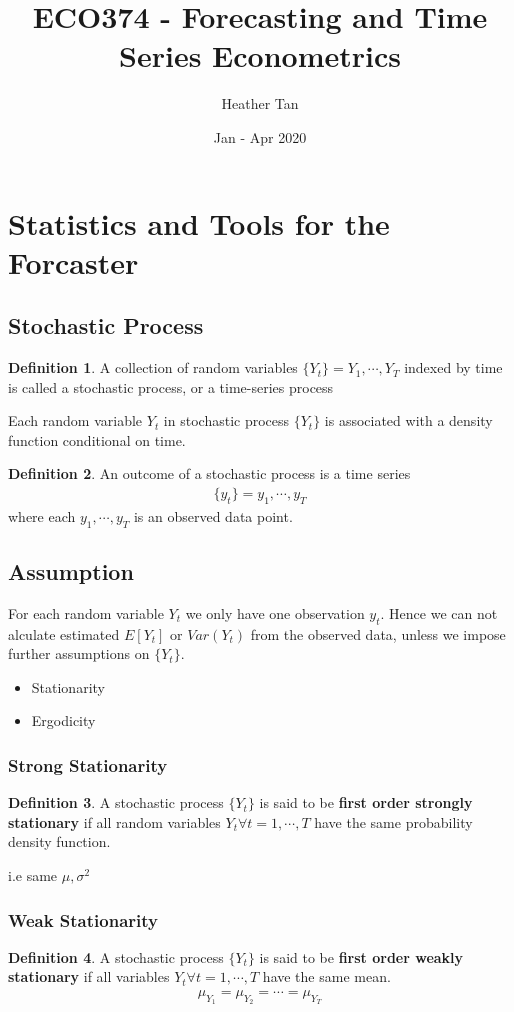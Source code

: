 \documentclass{article}
\title{ECO374 - Forecasting and Time Series Econometrics}
\author{Heather Tan}
\date{Jan - Apr 2020}
\theoremstyle{definition}
\newtheorem{definition}{Definition}[section]
\theoremstyle{thrm}
\theoremstyle{lma}
\theoremstyle{ppst}
\theoremstyle{crlr}
\begin{document}
\maketitle	
\tableofcontents
\pagebreak


\section{Statistics and Tools for the Forcaster}
\subsection{Stochastic Process}
\begin{definition}
	A collection of random variables $\{Y_t\} = Y_1,\cdots,Y_T$ indexed by time is called a stochastic process, or a time-series process
\end{definition}
Each random variable $Y_t$ in stochastic process $\{Y_t\}$ is associated with a density function conditional on time.\\
\begin{definition}
	An outcome of a stochastic process is a time series
\begin{align*}
	\{y_t\} = y_1,\cdots, y_T
\end{align*}
where each $y_1,\cdots, y_T$ is an observed data point.
\end{definition}
\subsection{Assumption}
For each random variable $Y_t$ we only have one observation $y_t$. Hence we can not alculate estimated $E[Y_t]$ or $Var(Y_t)$ from the observed data, unless we impose further assumptions on $\{Y_t\}$.
\begin{itemize}
	\item Stationarity
	\item Ergodicity
\end{itemize}
\subsubsection{Strong Stationarity}
\begin{definition}
	A stochastic process $\{Y_t\}$ is said to be \textbf{first order strongly stationary} if all random variables $Y_t \forall t = 1,\cdots, T$ have the same probability density function.
\end{definition}
i.e same $\mu,\sigma^2$
\subsubsection{Weak Stationarity}
\begin{definition}
	A stochastic process $\{Y_t\}$ is said to be \textbf{first order weakly stationary }if all variables $Y_t \forall t = 1,\cdots, T$ have the same mean.
\begin{align*}
	\mu_{Y_1} = \mu_{Y_2} = \cdots = \mu_{Y_T}
\end{align*}
\end{definition}
\end{document}
